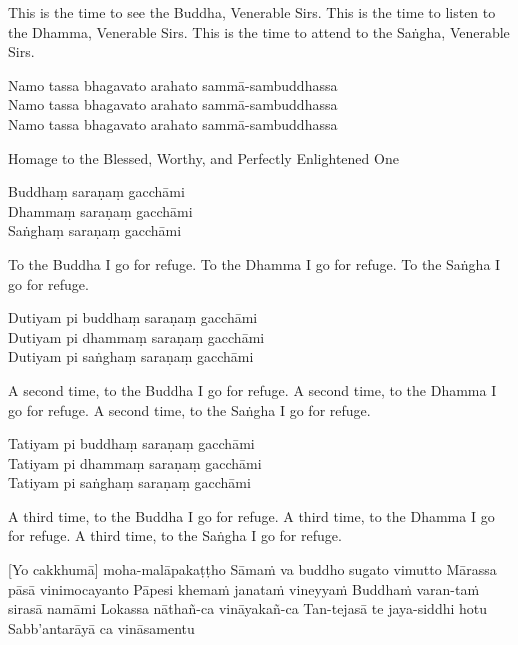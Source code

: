 \begin{english}
This is the time to see the Buddha, Venerable Sirs.
This is the time to listen to the Dhamma, Venerable Sirs.
This is the time to attend to the Saṅgha, Venerable Sirs.
\end{english}

\suttaRef{[Thai]}

Namo tassa bhagavato arahato sammā-sambuddhassa\\
Namo tassa bhagavato arahato sammā-sambuddhassa\\
Namo tassa bhagavato arahato sammā-sambuddhassa

\begin{english}
  Homage to the Blessed, Worthy, and Perfectly Enlightened One
\end{english}

Buddhaṃ saraṇaṃ gacchāmi\\
Dhammaṃ saraṇaṃ gacchāmi\\
Saṅghaṃ saraṇaṃ gacchāmi

\begin{english}
  To the Buddha I go for refuge.
  To the Dhamma I go for refuge.
  To the Saṅgha I go for refuge.
\end{english}

Dutiyam pi buddhaṃ saraṇaṃ gacchāmi\\
Dutiyam pi dhammaṃ saraṇaṃ gacchāmi\\
Dutiyam pi saṅghaṃ saraṇaṃ gacchāmi

\begin{english}
  A second time, to the Buddha I go for refuge.
  A second time, to the Dhamma I go for refuge.
  A second time, to the Saṅgha I go for refuge.
\end{english}

Tatiyam pi buddhaṃ saraṇaṃ gacchāmi\\
Tatiyam pi dhammaṃ saraṇaṃ gacchāmi\\
Tatiyam pi saṅghaṃ saraṇaṃ gacchāmi

\begin{english}
  A third time, to the Buddha I go for refuge.
  A third time, to the Dhamma I go for refuge.
  A third time, to the Saṅgha I go for refuge.
\end{english}

[Yo cakkhumā] moha-malāpakaṭṭho
Sāmaṁ va buddho sugato vimutto
Mārassa pāsā vinimocayanto
Pāpesi khemaṁ janataṁ vineyyaṁ
Buddhaṁ varan-taṁ sirasā namāmi
Lokassa nāthañ-ca vināyakañ-ca
Tan-tejasā te jaya-siddhi hotu
Sabb’antarāyā ca vināsamentu

